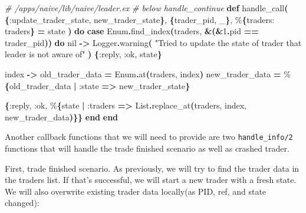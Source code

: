 \documentclass[
  oneside]{book}
\newenvironment{Shaded}{\begin{snugshade}}{\end{snugshade}}
\newcommand{\CommentTok}[1]{\textcolor[rgb]{0.56,0.35,0.01}{\textit{#1}}}
\newcommand{\ConstantTok}[1]{\textcolor[rgb]{0.56,0.35,0.01}{#1}}
\newcommand{\DecValTok}[1]{\textcolor[rgb]{0.00,0.00,0.81}{#1}}
\newcommand{\FunctionTok}[1]{\textcolor[rgb]{0.13,0.29,0.53}{\textbf{#1}}}
\newcommand{\KeywordTok}[1]{\textcolor[rgb]{0.13,0.29,0.53}{\textbf{#1}}}
\newcommand{\NormalTok}[1]{#1}
\newcommand{\OperatorTok}[1]{\textcolor[rgb]{0.81,0.36,0.00}{\textbf{#1}}}
\newcommand{\StringTok}[1]{\textcolor[rgb]{0.31,0.60,0.02}{#1}}
\newcommand{\VariableTok}[1]{\textcolor[rgb]{0.00,0.00,0.00}{#1}}
\begin{document}
\begin{Shaded}
\begin{Highlighting}[]
  \CommentTok{\# /apps/naive/lib/naive/leader.ex}
  \CommentTok{\# below handle\_continue}
  \KeywordTok{def}\NormalTok{ handle\_call}\FunctionTok{(}
    \FunctionTok{\{}\VariableTok{:update\_trader\_state}\NormalTok{, new\_trader\_state}\FunctionTok{\}}\NormalTok{,}
    \FunctionTok{\{}\NormalTok{trader\_pid, \_}\FunctionTok{\}}\NormalTok{,}
\NormalTok{    \%}\FunctionTok{\{}\VariableTok{traders:}\NormalTok{ traders}\FunctionTok{\}} \OperatorTok{=}\NormalTok{ state}
  \FunctionTok{)} \KeywordTok{do}
    \KeywordTok{case} \ConstantTok{Enum}\OperatorTok{.}\NormalTok{find\_index}\FunctionTok{(}\NormalTok{traders, }\OperatorTok{\&}\FunctionTok{(}\OperatorTok{\&}\DecValTok{1}\OperatorTok{.}\NormalTok{pid }\OperatorTok{==}\NormalTok{ trader\_pid}\FunctionTok{))} \KeywordTok{do}
      \ConstantTok{nil} \OperatorTok{{-}\textgreater{}}
        \ConstantTok{Logger}\OperatorTok{.}\NormalTok{warning}\FunctionTok{(}
          \StringTok{"Tried to update the state of trader that leader is not aware of"}
        \FunctionTok{)}
        \FunctionTok{\{}\VariableTok{:reply}\NormalTok{, }\VariableTok{:ok}\NormalTok{, state}\FunctionTok{\}}
      
\NormalTok{      index }\OperatorTok{{-}\textgreater{}}
\NormalTok{        old\_trader\_data }\OperatorTok{=} \ConstantTok{Enum}\OperatorTok{.}\NormalTok{at}\FunctionTok{(}\NormalTok{traders, index}\FunctionTok{)}
\NormalTok{        new\_trader\_data }\OperatorTok{=}\NormalTok{ \%}\FunctionTok{\{}\NormalTok{old\_trader\_data }\OperatorTok{|} \VariableTok{:state} \OperatorTok{=\textgreater{}}\NormalTok{ new\_trader\_state}\FunctionTok{\}}

        \FunctionTok{\{}\VariableTok{:reply}\NormalTok{, }\VariableTok{:ok}\NormalTok{, \%}\FunctionTok{\{}\NormalTok{state }\OperatorTok{|} \VariableTok{:traders} \OperatorTok{=\textgreater{}}
          \ConstantTok{List}\OperatorTok{.}\NormalTok{replace\_at}\FunctionTok{(}\NormalTok{traders, index, new\_trader\_data}\FunctionTok{)\}\}}
    \KeywordTok{end}
  \KeywordTok{end}
\end{Highlighting}
\end{Shaded}

Another callback functions that we will need to provide are two \texttt{handle\_info/2} functions that will handle the trade finished scenario as well as crashed trader.

\newpage

First, trade finished scenario. As previously, we will try to find the trader data in the traders list. If that's successful, we will start a new trader with a fresh state. We will also overwrite existing trader data locally(as PID, ref, and state changed):
\end{document}
